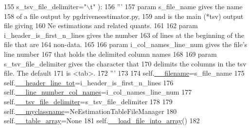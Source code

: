 \begin{DoxyCode}
155                     s\_tsv\_file\_delimiter=\textcolor{stringliteral}{"\(\backslash\)t"} ):
156         \textcolor{stringliteral}{'''}
157 \textcolor{stringliteral}{        param s\_file\_name gives the name}
158 \textcolor{stringliteral}{        of a file output by pgdriveneestimator.py,}
159 \textcolor{stringliteral}{        and is the main (*tsv) output file giving}
160 \textcolor{stringliteral}{        Ne estimations and related quants.}
161 \textcolor{stringliteral}{}
162 \textcolor{stringliteral}{        param i\_header\_is\_first\_n\_lines gives the number }
163 \textcolor{stringliteral}{        of lines at the beginning of the file that are}
164 \textcolor{stringliteral}{        non-data.}
165 \textcolor{stringliteral}{}
166 \textcolor{stringliteral}{        param i\_col\_names\_line\_num gives the file's line number}
167 \textcolor{stringliteral}{        that holds the delimited column names}
168 \textcolor{stringliteral}{        }
169 \textcolor{stringliteral}{        param s\_tsv\_file\_delimiter gives the character that}
170 \textcolor{stringliteral}{        delimits the columns in the tsv file. The default}
171 \textcolor{stringliteral}{        is <tab>.}
172 \textcolor{stringliteral}{        '''}
173 
174         self.\hyperlink{classnegui_1_1pgneestimationtablefilemanager_1_1NeEstimationTableFileManager_a58669d6c207e1603dc211fc7d91406b3}{\_\_filename}=s\_file\_name
175         self.\hyperlink{classnegui_1_1pgneestimationtablefilemanager_1_1NeEstimationTableFileManager_a3dd9604289c58c67660dd87adf73e34d}{\_\_header\_line\_tot}=i\_header\_is\_first\_n\_lines
176         self.\hyperlink{classnegui_1_1pgneestimationtablefilemanager_1_1NeEstimationTableFileManager_a878f90578dfc2067610228c02e645e5d}{\_\_line\_number\_col\_names}=i\_col\_names\_line\_num
177         self.\hyperlink{classnegui_1_1pgneestimationtablefilemanager_1_1NeEstimationTableFileManager_a8835a863f95d624a0f9d07f5d181bc1d}{\_\_tsv\_file\_delimiter}=s\_tsv\_file\_delimiter
178 
179         self.\hyperlink{classnegui_1_1pgneestimationtablefilemanager_1_1NeEstimationTableFileManager_a6b2c93498d82037b0572887c8fcaaf0c}{\_\_myclassname}=NeEstimationTableFileManager
180         self.\hyperlink{classnegui_1_1pgneestimationtablefilemanager_1_1NeEstimationTableFileManager_aeb8af3298586746993ee12dfcaf209f8}{\_\_table\_array}=\textcolor{keywordtype}{None}
181         self.\hyperlink{classnegui_1_1pgneestimationtablefilemanager_1_1NeEstimationTableFileManager_a6d512dd6008b4d12bd174edee46cd41c}{\_\_load\_file\_into\_array}()
182                 

\end{DoxyCode}
